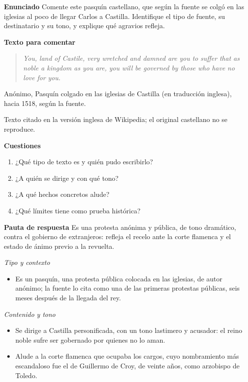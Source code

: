 \documentclass{book}
\begin{document}
\begin{tcolorbox}[title={Ejercicio resuelto}, studiumworked, breakable]

\noindent\textbf{Enunciado}
Comente este pasquín castellano, que según la fuente se colgó en las iglesias al poco de llegar Carlos a Castilla. Identifique el tipo de fuente, su destinatario y su tono, y explique qué agravios refleja.


\noindent\textbf{Texto para comentar}

\begin{quote}
\itshape You, land of Castile, very wretched and damned are you to suffer that as noble a kingdom as you are, you will be governed by those who have no love for you.
\end{quote}
{\noindent\footnotesize Anónimo, Pasquín colgado en las iglesias de Castilla (en traducción inglesa), hacia 1518, según la fuente.\par}
{\noindent\footnotesize Texto citado en la versión inglesa de Wikipedia; el original castellano no se reproduce.\par}

\noindent\textbf{Cuestiones}
\begin{enumerate}
\item ¿Qué tipo de texto es y quién pudo escribirlo?
\item ¿A quién se dirige y con qué tono?
\item ¿A qué hechos concretos alude?
\item ¿Qué límites tiene como prueba histórica?
\end{enumerate}

\noindent\textbf{Pauta de respuesta}
Es una protesta anónima y pública, de tono dramático, contra el gobierno de extranjeros: refleja el recelo ante la corte flamenca y el estado de ánimo previo a la revuelta.


\noindent\textit{Tipo y contexto}
\begin{itemize}
\item Es un pasquín, una protesta pública colocada en las iglesias, de autor anónimo; la fuente lo cita como una de las primeras protestas públicas, seis meses después de la llegada del rey.
\end{itemize}

\noindent\textit{Contenido y tono}
\begin{itemize}
\item Se dirige a Castilla personificada, con un tono lastimero y acusador: el reino noble sufre ser gobernado por quienes no lo aman.
\item Alude a la corte flamenca que ocupaba los cargos, cuyo nombramiento más escandaloso fue el de Guillermo de Croy, de veinte años, como arzobispo de Toledo.
\end{itemize}


\end{tcolorbox}
\end{document}
